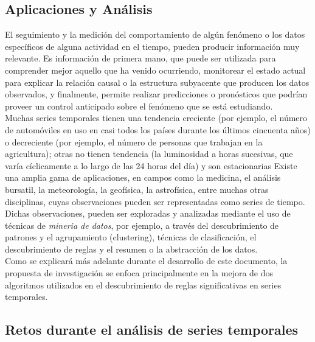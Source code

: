 \subsection{Aplicaciones y An\'alisis}
El seguimiento y la medici\'on del comportamiento de alg\'un fen\'omeno o los datos espec\'ificos de alguna actividad en el tiempo, pueden producir informaci\'on muy relevante. Es informaci\'on de primera mano, que puede ser utilizada para comprender mejor aquello que ha venido ocurriendo, monitorear el estado actual para explicar la relaci\'on causal o la estructura subyacente que producen los datos observados, y finalmente, permite realizar predicciones o pron\'osticos que podr\'ian proveer un control anticipado sobre el fen\'omeno que se est\'a estudiando.\\
Muchas series temporales tienen una tendencia creciente (por ejemplo, el n\'umero de autom\'oviles en uso en casi todos los pa\'ises durante los \'ultimos cincuenta a\~nos) o decreciente (por ejemplo, el n\'umero de personas que trabajan en la agricultura); otras no tienen tendencia (la luminosidad a horas sucesivas, que var\'ia c\'iclicamente a lo largo de las 24 horas del d\'ia) y son estacionarias
Existe una amplia gama de aplicaciones, en campos como la medicina, el an\'alisis bursatil, la meteorolog\'ia, la geof\'isica, la astrof\'isica, entre muchas otras disciplinas, cuyas observaciones pueden ser representadas como series de tiempo. Dichas observaciones, pueden ser exploradas y analizadas mediante el uso de t\'ecnicas de \textit{mineria de datos}, por ejemplo, a trav\'es del descubrimiento de patrones y el agrupamiento (clustering), t\'ecnicas  de clasificaci\'on, el descubrimiento de reglas y el resumen o la abstracci\'on de los datos.\\
Como se explicar\'a m\'as adelante durante el desarrollo de este documento, la propuesta de investigaci\'on se enfoca principalmente en la mejora de dos algoritmos utilizados en el descubrimiento de reglas significativas en series temporales.\\
\subsection{Retos durante el an\'alisis de series temporales}









